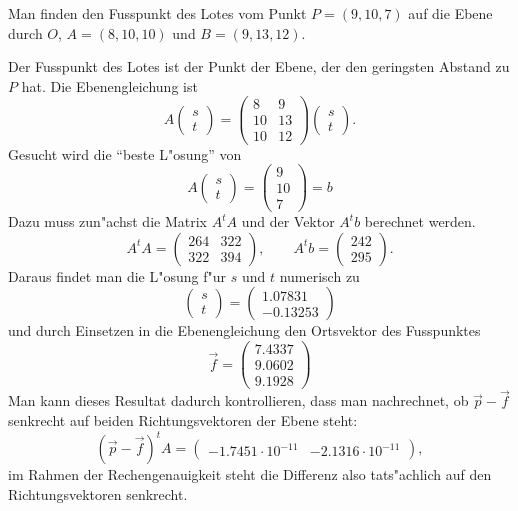 \begin{beispiel}
Man finden den Fusspunkt des Lotes vom Punkt $P=(9,10,7)$ auf die Ebene
durch $O$, $A=(8,10,10)$ und $B=(9,13,12)$.

Der Fusspunkt des Lotes ist der Punkt der Ebene, der den geringsten
Abstand zu $P$ hat.
Die Ebenengleichung ist
\[
A\begin{pmatrix}s\\t\end{pmatrix}=
\begin{pmatrix}
 8& 9\\
10&13\\
10&12
\end{pmatrix}
\begin{pmatrix}s\\t\end{pmatrix}.
\]
Gesucht wird die ``beste L"osung'' von
\[
A\begin{pmatrix}s\\t\end{pmatrix}=\begin{pmatrix}9\\10\\7\end{pmatrix}=b
\]
Dazu muss zun"achst die Matrix $A^tA$ und der Vektor $A^tb$
berechnet werden.
\[
A^tA=\begin{pmatrix}
264&322\\
322&394
\end{pmatrix}
,\qquad
A^tb=\begin{pmatrix}
242\\295
\end{pmatrix}.
\]
Daraus findet man die L"osung f"ur $s$ und $t$ numerisch zu
\[
\begin{pmatrix}s\\t \end{pmatrix}
=
\begin{pmatrix}
   1.07831\\
  -0.13253
\end{pmatrix}
\]
und durch Einsetzen in die Ebenengleichung den Ortsvektor des Fusspunktes
\[
\vec f = \begin{pmatrix}
   7.4337\\
   9.0602\\
   9.1928
\end{pmatrix}
\]
Man kann dieses Resultat dadurch kontrollieren, dass man nachrechnet, ob
$\vec p-\vec f$ senkrecht auf beiden Richtungsvektoren der Ebene
steht:
\[
(\vec p-\vec f)^tA=\begin{pmatrix}
  -1.7451\cdot10^{-11}&  -2.1316\cdot 10^{-11}
\end{pmatrix},
\]
im Rahmen der Rechengenauigkeit steht die Differenz also tats"achlich auf
den Richtungsvektoren senkrecht.
\end{beispiel}


